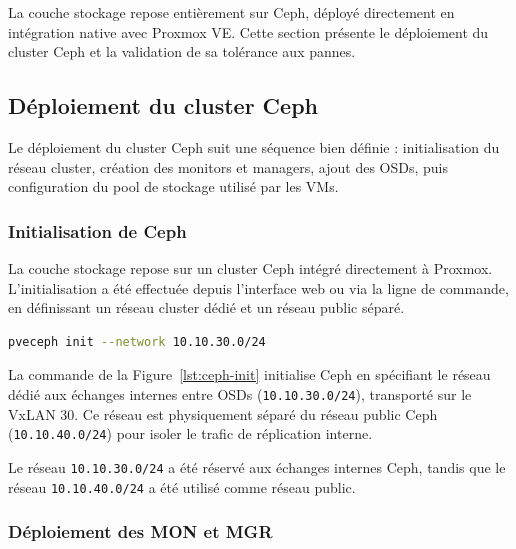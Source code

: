 \par La couche stockage repose entièrement sur Ceph, déployé directement en intégration native avec Proxmox VE. Cette section présente le déploiement du cluster Ceph et la validation de sa tolérance aux pannes.

\subsection{Déploiement du cluster Ceph}

\par Le déploiement du cluster Ceph suit une séquence bien définie : initialisation du réseau cluster, création des monitors et managers, ajout des OSDs, puis configuration du pool de stockage utilisé par les VMs.

\subsubsection{Initialisation de Ceph}

\par La couche stockage repose sur un cluster Ceph intégré directement à Proxmox. L'initialisation a été effectuée depuis l'interface web ou via la ligne de commande, en définissant un réseau cluster dédié et un réseau public séparé.\\

\begin{lstlisting}[style=sonacode,language=bash,caption={Initialisation du cluster Ceph},label={lst:ceph-init}]
pveceph init --network 10.10.30.0/24
\end{lstlisting}

\par La commande de la Figure~\ref{lst:ceph-init} initialise Ceph en spécifiant le réseau dédié aux échanges internes entre OSDs (\texttt{10.10.30.0/24}), transporté sur le VxLAN 30. Ce réseau est physiquement séparé du réseau public Ceph (\texttt{10.10.40.0/24}) pour isoler le trafic de réplication interne.\\

\par Le réseau \texttt{10.10.30.0/24} a été réservé aux échanges internes Ceph, tandis que le réseau \texttt{10.10.40.0/24} a été utilisé comme réseau public.\\

\subsubsection{Déploiement des MON et MGR}

